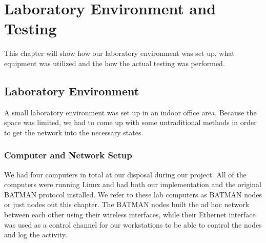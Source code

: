 \chapter{Laboratory Environment and Testing}
\label{environment_testing}
This chapter will show how our laboratory environment was set up, what equipment was utilized and the how the actual testing was performed.

\section{Laboratory Environment}
A small laboratory environment was set up in an indoor office area. Because the space was limited, we had to come up with some untraditional methods in order to get the network into the necessary states.

\subsection{Computer and Network Setup}
We had four computers in total at our disposal during our project. All of the computers were running Linux and had both our implementation and the original BATMAN protocol installed. We refer to these lab computers as BATMAN nodes or just nodes out this chapter. The BATMAN nodes built the ad hoc network between each other using their wireless interfaces, while their Ethernet interface was used as a control channel for our workstations to be able to control the nodes and log the activity.
 

